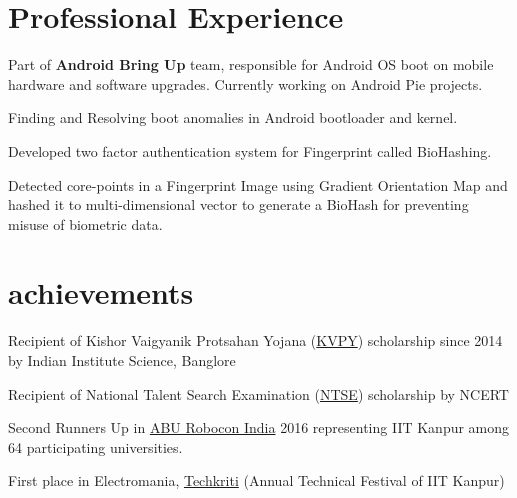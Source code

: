 \documentclass[]{deedy-resume-openfont}
\begin{document}
\begin{minipage}[t]{0.69\textwidth} 

\section{Professional Experience}
\vspace{3.5mm}
\begin{tightemize}
\item Part of \textbf{Android Bring Up} team, responsible for Android OS boot on mobile hardware and software upgrades. Currently working on Android Pie projects.
\item Finding and Resolving boot anomalies in Android bootloader and kernel.
\end{tightemize}
\begin{tightemize}
\item Developed two factor authentication system for Fingerprint called BioHashing.
\item Detected core-points in a Fingerprint Image using Gradient Orientation Map and hashed it to multi-dimensional vector to generate a BioHash for preventing misuse of biometric data.
\end{tightemize} 
\section{achievements}
\vspace{2mm}
\begin{tightemize}
	\item Recipient of Kishor Vaigyanik Protsahan Yojana (\href{http://www.kvpy.iisc.ernet.in/main/index.htm}{KVPY}) scholarship since 2014 by Indian Institute Science, Banglore
	\item Recipient of National Talent Search Examination (\href{http://www.ncert.nic.in/programmes/talent_exam/index_talent.html}{NTSE}) scholarship by NCERT 
	\item Second Runners Up in \href{http://www.roboconindia.com/}{ABU Robocon India} 2016 representing IIT Kanpur among 64 participating universities.
	\item First place in Electromania, \href{https://techkriti.org/}{Techkriti} (Annual Technical Festival of IIT Kanpur)
\end{tightemize}


\end{minipage}
\end{document}
